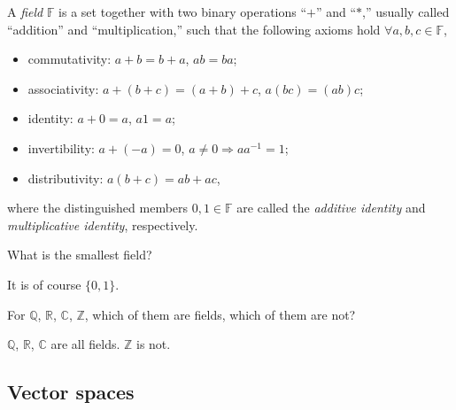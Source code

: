 
\begin{defn}
  \label{def:field}
  A \emph{field} $\mathbb{F}$ is a set together with two binary
  operations ``$+$'' and ``$*$,''
  usually called ``addition'' and ``multiplication,''
  such that 
  the following axioms hold
  \mbox{$\forall a,b,c\in\mathbb{F}$},
  \begin{itemize}\itemsep0em
  \item commutativity: $a+b=b+a$, $ab=ba$;
  \item associativity: $a+(b+c)=(a+b)+c$, $a(bc)=(ab)c$;
  \item identity: $a+0=a$, $a1=a$; %
  \item invertibility: $a+(-a)=0$, $a\ne 0 \Rightarrow a a^{-1}=1$;
  \item distributivity: $a(b+c)=ab+ac$,
  \end{itemize}
  where the distinguished members $0,1\in \mathbb{F}$ are called the
  \emph{additive identity} and \emph{multiplicative identity},
  respectively.
\end{defn}

\begin{exc}
  What is the smallest field?
\end{exc}
\begin{solution}
  It is of course $\{0,1\}$.
\end{solution}

\begin{exc}
  For $\mathbb{Q}$, $\mathbb{R}$, $\mathbb{C}$,
  $\mathbb{Z}$,
  which of them are fields, which of them are not?
\end{exc}
\begin{solution}
  $\mathbb{Q}$, $\mathbb{R}$, $\mathbb{C}$
  are all fields.
  $\mathbb{Z}$ is not.
\end{solution}


\subsection{Vector spaces}

